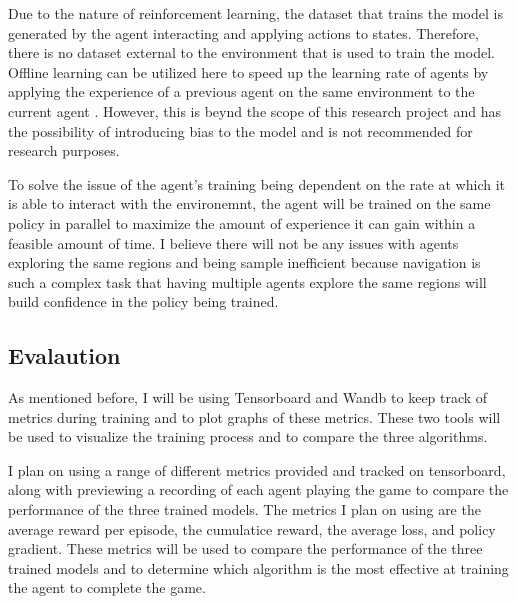 Due to the nature of reinforcement learning, the dataset that trains the model is generated by the agent interacting and applying actions to states. Therefore, there is no dataset external to the environment that is used to train the model. Offline learning can be utilized here to speed up the learning rate of agents by applying the experience of a previous agent on the same environment to the current agent \cite{Sutton1}. However, this is beynd the scope of this research project and has the possibility of introducing bias to the model and is not recommended for research purposes.

To solve the issue of the agent's training being dependent on the rate at which it is able to interact with the environemnt, the agent will be trained on the same policy in parallel to maximize the amount of experience it can gain within a feasible amount of time. I believe there will not be any issues with agents exploring the same regions and being sample inefficient because navigation is such a complex task that having multiple agents explore the same regions will build confidence in the policy being trained.

\subsection{Evalaution}

As mentioned before, I will be using Tensorboard and Wandb to keep track of metrics during training and to plot graphs of these metrics. These two tools will be used to visualize the training process and to compare the three algorithms.

I plan on using a range of different metrics provided and tracked on tensorboard, along with previewing a recording of each agent playing the game to compare the performance of the three trained models. The metrics I plan on using are the average reward per episode, the cumulatice reward, the average loss, and policy gradient. These metrics will be used to compare the performance of the three trained models and to determine which algorithm is the most effective at training the agent to complete the game.